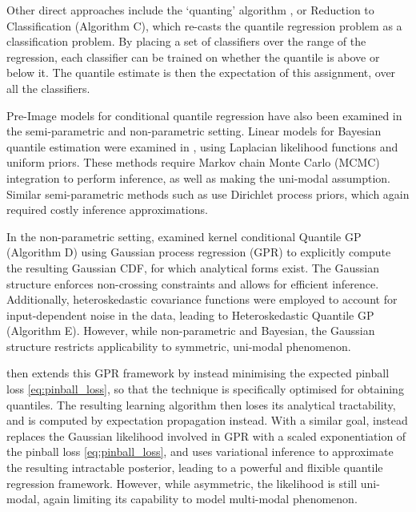 \documentclass[twoside]{article} \usepackage{aistats2017}
\theoremstyle{definition}
\theoremstyle{theorem}
\begin{document}
	Other direct approaches include the `quanting' algorithm \citep{langford2012predicting}, or Reduction to Classification (Algorithm C), which re-casts the quantile regression problem as a classification problem. By placing a set of classifiers over the range of the regression, each classifier can be trained on whether the quantile is above or below it. The quantile estimate is then the expectation of this assignment, over all the classifiers.

	Pre-Image models for conditional quantile regression have also been examined in the semi-parametric and non-parametric setting. Linear models for Bayesian quantile estimation were examined in \cite{yu2001bayesian}, using Laplacian likelihood functions and uniform priors. These methods require Markov chain Monte Carlo (MCMC) integration to perform inference, as well as making the uni-modal assumption. Similar semi-parametric methods such as \cite{hjort2007nonparametric, hjort2009quantile} use Dirichlet process priors, which again required costly inference approximations.
	
	In the non-parametric setting, \cite{quadrianto2009kernel} examined kernel conditional Quantile GP (Algorithm D) using Gaussian process regression (GPR) \citep{rasmussen2006gaussian} to explicitly compute the resulting Gaussian CDF, for which analytical forms exist. The Gaussian structure enforces non-crossing constraints and allows for efficient inference. Additionally, heteroskedastic covariance functions were employed to account for input-dependent noise in the data, leading to Heteroskedastic Quantile GP (Algorithm E). However, while non-parametric and Bayesian, the Gaussian structure restricts applicability to symmetric, uni-modal phenomenon.
	
	\cite{boukouvalas2012gaussian} then extends this GPR framework by instead minimising the expected pinball loss \eqref{eq:pinball_loss}, so that the technique is specifically optimised for obtaining quantiles. The resulting learning algorithm then loses its analytical tractability, and is computed by expectation propagation instead. With a similar goal, \cite{abeywardana2015variational} instead replaces the Gaussian likelihood involved in GPR with a scaled exponentiation of the pinball loss \eqref{eq:pinball_loss}, and uses variational inference to approximate the resulting intractable posterior, leading to a powerful and flixible quantile regression framework. However, while asymmetric, the likelihood is still uni-modal, again limiting its capability to model multi-modal phenomenon.
	 
\end{document}
